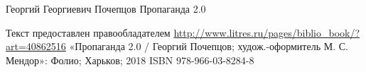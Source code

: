  
 
 
 
 


Георгий Георгиевич Почепцов 
Пропаганда 2.0

Текст предоставлен правообладателем \url{http://www.litres.ru/pages/biblio_book/?art=40862516}
«Пропаганда 2.0 / Георгий Почепцов; худож.-оформитель М. С. Мендор»: Фолио; Харьков; 2018
ISBN 978-966-03-8284-8




